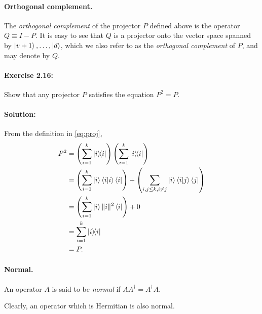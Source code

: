 \paragraph{Orthogonal complement.} The \emph{orthogonal complement} of the
projector $P$ defined above is the operator $Q \equiv I - P$. It is easy to see
that $Q$ is a projector onto the vector space spanned by $\ket{v+1}, \ldots,
\ket{d}$, which we also refer to as the \emph{orthogonal complement} of $P$,
and may denote by $Q$.

\paragraph{\cite{mikeandike} Exercise 2.16:} Show that any projector $P$
satisfies the equation $P^2 = P$.

\paragraph{Solution:} From the definition in \eqref{eq:proj}, \begin{align*}
  P^2 &= \left(\sum_{i=1}^k \ketbra{i}{i}\right) \left(\sum_{i=1}^k
      \ketbra{i}{i}\right) \\
      &= \left(\sum_{i=1}^k \ket{i}\braket{i}{i}\bra{i}\right) + \left(
        \sum_{i, j \leq k, i \neq j} \ket{i}\braket{i}{j}\bra{j}\right) \\
      &= \left(\sum_{i=1}^k \ket{i} \|i\|^2 \bra{i}\right) + 0 \\
      &= \sum_{i=1}^k \ketbra{i}{i} \\
      &= P.
\end{align*}

\paragraph{Normal.} An operator $A$ is said to be \emph{normal} if $A A^\dagger
= A^\dagger A$.

Clearly, an operator which is Hermitian is also normal.

